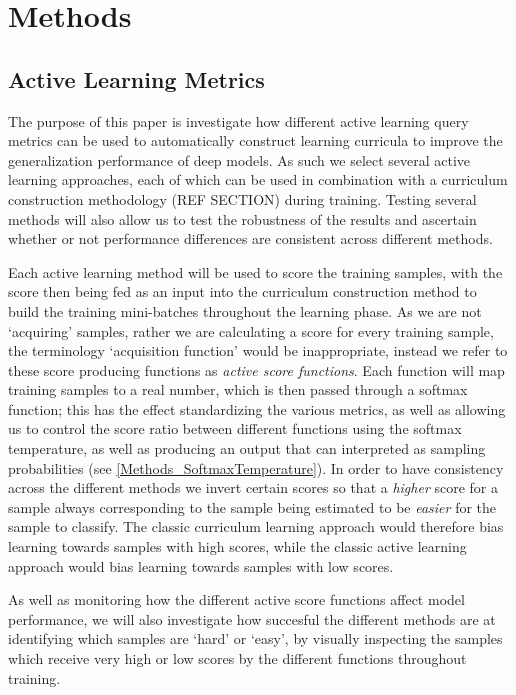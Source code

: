 \chapter{Methods}

\section{Active Learning Metrics}
The purpose of this paper is investigate how different active learning query metrics can be used to automatically construct learning curricula to improve the generalization performance of deep models. As such we select several active learning approaches, each of which can be used in combination with a curriculum construction methodology (REF SECTION) during training. Testing several methods will also allow us to test the robustness of the results and ascertain whether or not performance differences are consistent across different methods. 

Each active learning method will be used to score the training samples, with the score then being fed as an input into the curriculum construction method to build the training mini-batches throughout the learning phase. As we are not `acquiring' samples, rather we are calculating a score for every training sample, the terminology `acquisition function' would be inappropriate, instead we refer to these score producing functions as \textit{active score functions}.  Each function will map training samples to a real number, which is then passed through a softmax function; this has the effect standardizing the various metrics, as well as allowing us to control the score ratio between different functions using the softmax temperature, as well as producing an output that can interpreted as sampling probabilities (see \ref{Methods_SoftmaxTemperature}). In order to have consistency across the different methods we invert certain scores so that a \textit{higher} score for a sample always corresponding to the sample being estimated to be \textit{easier} for the sample to classify. The classic curriculum learning approach would therefore bias learning towards samples with high scores, while the classic active learning approach would bias learning towards samples with low scores. 

As well as monitoring how the different active score functions affect model performance, we will also investigate how succesful the different methods are at identifying which samples are `hard' or `easy', by visually inspecting the samples which receive very high or low scores by the different functions throughout training. 
